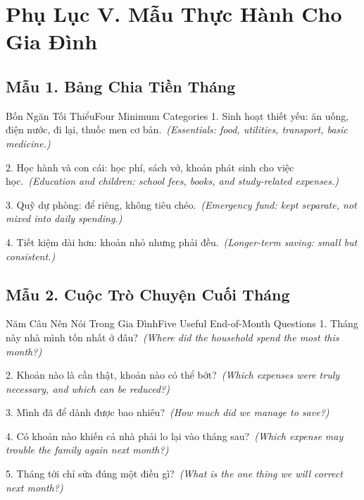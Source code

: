 \chapter*{Phụ Lục V. Mẫu Thực Hành Cho Gia Đình}

\section*{Mẫu 1. Bảng Chia Tiền Tháng}
\begin{truyen}{Bốn Ngăn Tối Thiểu}{Four Minimum Categories}
1. Sinh hoạt thiết yếu: ăn uống, điện nước, đi lại, thuốc men cơ bản.\
\textit{(Essentials: food, utilities, transport, basic medicine.)}

2. Học hành và con cái: học phí, sách vở, khoản phát sinh cho việc học.\
\textit{(Education and children: school fees, books, and study-related expenses.)}

3. Quỹ dự phòng: để riêng, không tiêu chéo.\
\textit{(Emergency fund: kept separate, not mixed into daily spending.)}

4. Tiết kiệm dài hơn: khoản nhỏ nhưng phải đều.\
\textit{(Longer-term saving: small but consistent.)}
\end{truyen}

\section*{Mẫu 2. Cuộc Trò Chuyện Cuối Tháng}
\begin{truyen}{Năm Câu Nên Nói Trong Gia Đình}{Five Useful End-of-Month Questions}
1. Tháng này nhà mình tốn nhất ở đâu?\
\textit{(Where did the household spend the most this month?)}

2. Khoản nào là cần thật, khoản nào có thể bớt?\
\textit{(Which expenses were truly necessary, and which can be reduced?)}

3. Mình đã để dành được bao nhiêu?\
\textit{(How much did we manage to save?)}

4. Có khoản nào khiến cả nhà phải lo lại vào tháng sau?\
\textit{(Which expense may trouble the family again next month?)}

5. Tháng tới chỉ sửa đúng một điều gì?\
\textit{(What is the one thing we will correct next month?)}
\end{truyen}


